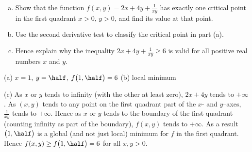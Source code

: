 \begin{question}[M200 2002A] %
\begin{enumerate}[(a)]
\item
Show that the function 
$f(x,y)=2x+4y+\frac{1}{xy}$
has exactly one critical point in the first quadrant $x>0$, $y>0$, and
find its value at that point.

\item 
Use the second derivative test to classify the critical point in part (a).

\item 
Hence explain why the inequality $2x+4y+\frac{1}{xy}\ge 6$ 
is valid for all positive real numbers $x$ and $y$.
\end{enumerate}
\end{question}


\begin{answer}
(a) $x=1$, $y=\half$, $f\big(1,\half\big)=6$\qquad
(b) local minimum

(c) As $x$ or $y$ tends to infinity (with the other at least zero), 
$2x+4y$ tends to $+\infty$. As $(x,y)$ tends to any point on the first quadrant part of the $x$- and $y$--axes, $\frac{1}{xy}$ tends to $+\infty$.  
Hence as $x$ or $y$ tends to the boundary of the first quadrant 
(counting infinity as part of the boundary), $f(x,y)$ tends to $+\infty$. 
As a result $\big(1,\half\big)$ is a global (and not just local) minimum 
for $f$ in the first quadrant. Hence $f(x,y)\ge f\big(1,\half\big)=6$ 
for all $x,y>0$. 
\end{answer}

